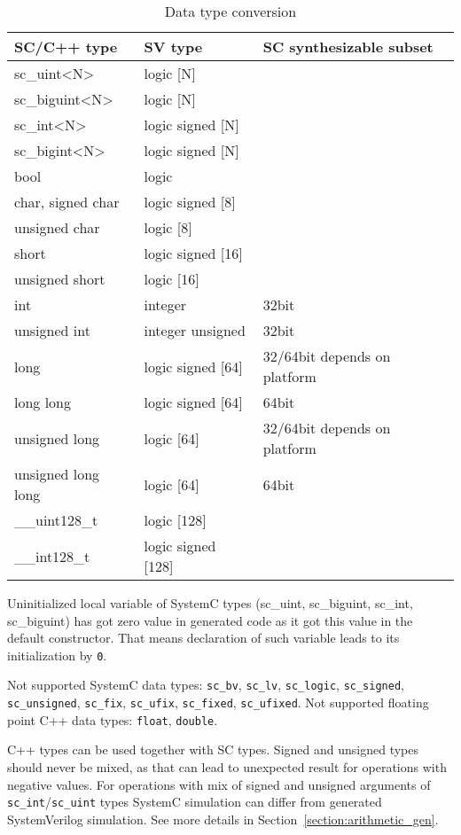 \begin{table}
\begin{tabular}{|l|l|l|}
\hline
SC/C++ type & SV type  & SC synthesizable subset \\
\hline
sc\_uint<N> & logic [N] & \\
sc\_biguint<N> & logic [N] & \\
sc\_int<N> & logic signed [N] & \\
sc\_bigint<N> & logic signed [N] & \\
bool & logic & \\
char, signed char & logic signed [8] & \\
unsigned char & logic [8] & \\
short & logic signed [16] & \\
unsigned short & logic [16] & \\
int & integer & 32bit \\
unsigned int & integer unsigned & 32bit \\
long & logic signed [64] & 32/64bit depends on platform \\
long long & logic signed [64] & 64bit \\
unsigned long & logic [64] & 32/64bit depends on platform \\
unsigned long long & logic [64] & 64bit \\
\_\_uint128\_t & logic [128] & \\
\_\_int128\_t & logic signed [128] & \\
\hline
\end{tabular}
\caption{Data type conversion}
\label{tab:data_types}
\end{table}

Uninitialized local variable of SystemC types (sc\_uint, sc\_biguint, sc\_int, sc\_biguint) has got zero value in generated code as it got this value in the default constructor.
That means declaration of such variable leads to its initialization by {\tt 0}.

Not supported SystemC data types: {\tt sc\_bv}, {\tt sc\_lv}, {\tt sc\_logic}, {\tt sc\_signed}, {\tt sc\_unsigned}, {\tt sc\_fix}, {\tt sc\_ufix}, {\tt sc\_fixed}, {\tt sc\_ufixed}. 
Not supported floating point C++ data types: {\tt float}, {\tt double}.

C++ types can be used together with SC types. Signed and unsigned types should never be mixed, as that can lead to unexpected result for operations with negative values. For operations with mix of signed and unsigned arguments of {\tt sc\_int}/{\tt sc\_uint} types SystemC simulation can differ from generated SystemVerilog simulation. See more details in Section~\ref{section:arithmetic_gen}.



